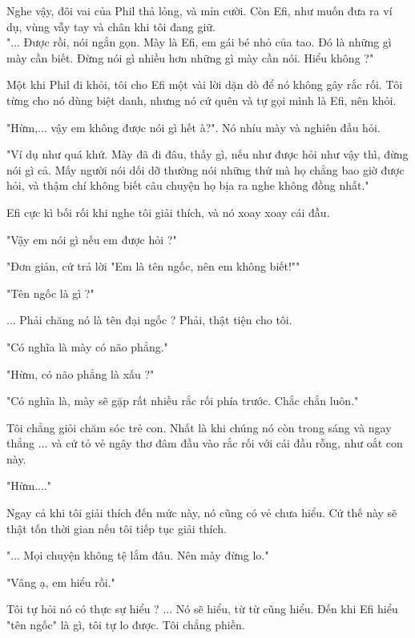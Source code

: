  Nghe vậy, đôi vai của Phil thả lỏng, và mỉn cười. Còn Efi, như muốn đưa ra ví dụ, vùng vẫy tay và chân khi tôi đang giữ.\\
 
 
 
 "... Được rồi, nói ngắn gọn. Mày là Efi, em gái bé nhỏ của tao. Đó là những gì mày cần biết. Đừng nói gì nhiều hơn những gì mày cần nói. Hiểu không ?"
 
 Một khi Phil đi khỏi, tôi cho Efi một vài lời dặn dò để nó không gây rắc rối. Tôi từng cho nó dùng biệt danh, nhưng nó cứ quên và tự gọi mình là Efi, nên khỏi.
 
 "Hừm,... vậy em không được nói gì hết à?". Nó nhíu mày và nghiên đầu hỏi.
 
 "Ví dụ như quá khứ. Mày đã đi đâu, thấy gì, nếu như được hỏi như vậy thì, đừng nói gì cả. Mấy người nói dối dỡ thường nói những thứ mà họ chẳng bao giờ được hỏi, và thậm chí không biết câu chuyện họ bịa ra nghe không đồng nhất."
 
 Efi cực kì bối rối khi nghe tôi giải thích, và nó xoay xoay cái đầu.
 
 "Vậy em nói gì nếu em được hỏi ?"
 
 "Đơn giản, cứ trả lời "Em là tên ngốc, nên em không biết!""
 
 "Tên ngốc là gì ?"
 
 ... Phải chăng nó là tên đại ngốc ? Phải, thật tiện cho tôi.
 
 "Có nghĩa là mày có não phẳng."
 
 "Hừm, có não phẳng là xấu ?"
 
 "Có nghĩa là, mày sẽ gặp rất nhiều rắc rối phía trước. Chắc chắn luôn."

Tôi chẳng giỏi chăm sóc trẻ con. Nhất là khi chúng nó còn trong sáng và ngay thẳng ... và cứ tỏ vẻ ngây thơ đâm đầu vào rắc rối với cái đầu rỗng, như oắt con này.
 
 "Hừm...."
 
 Ngay cả khi tôi giải thích đến mức này, nó cũng có vẻ chưa hiểu. Cứ thế này sẽ thật tốn thời gian nếu tôi tiếp tục giải thích.
 
 "... Mọi chuyện không tệ lắm đâu. Nên mày đừng lo."
 
 "Vâng ạ, em hiểu rồi."
 
 Tôi tự hỏi nó có thực sự hiểu ? ... Nó sẽ hiểu, từ từ cũng hiểu. Đến khi Efi hiểu "tên ngốc" là gì, tôi tự lo được. Tôi chẳng phiền.
 
